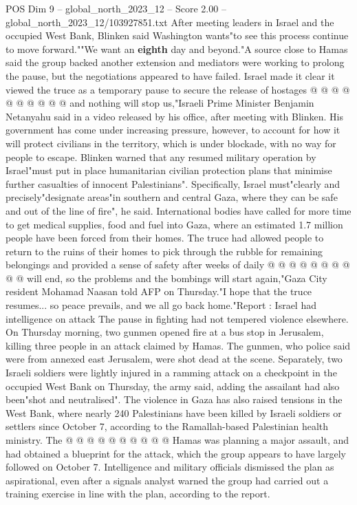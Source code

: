 \begin{textsample}{POS Dim 9 – global\_north\_2023\_12 – Score 2.00 – global\_north\_2023\_12/103927851.txt}
After meeting leaders in Israel and the occupied West Bank, Blinken said Washington wants"to see this process continue to move forward.""We want an \textbf{eighth} day and beyond."A source close to Hamas said the group backed another extension and mediators were working to prolong the pause, but the negotiations appeared to have failed.
Israel made it clear it viewed the truce as a temporary pause to secure the release of hostages @ @ @ @ @ @ @ @ @ @ and nothing will stop us,"Israeli Prime Minister Benjamin Netanyahu said in a video released by his office, after meeting with Blinken.
His government has come under increasing pressure, however, to account for how it will protect civilians in the territory, which is under blockade, with no way for people to escape.
Blinken warned that any resumed military operation by Israel"must put in place humanitarian civilian protection plans that minimise further casualties of innocent Palestinians".
Specifically, Israel must"clearly and precisely"designate areas"in southern and central Gaza, where they can be safe and out of the line of fire", he said.
International bodies have called for more time to get medical supplies, food and fuel into Gaza, where an estimated 1.7 million people have been forced from their homes.
The truce had allowed people to return to the ruins of their homes to pick through the rubble for remaining belongings and provided a sense of safety after weeks of daily @ @ @ @ @ @ @ @ @ @ will end, so the problems and the bombings will start again,"Gaza City resident Mohamad Naasan told AFP on Thursday."I hope that the truce resumes... so peace prevails, and we all go back home."Report : Israel had intelligence on attack The pause in fighting had not tempered violence elsewhere.
On Thursday morning, two gunmen opened fire at a bus stop in Jerusalem, killing three people in an attack claimed by Hamas.
The gunmen, who police said were from annexed east Jerusalem, were shot dead at the scene.
Separately, two Israeli soldiers were lightly injured in a ramming attack on a checkpoint in the occupied West Bank on Thursday, the army said, adding the assailant had also been"shot and neutralised".
The violence in Gaza has also raised tensions in the West Bank, where nearly 240 Palestinians have been killed by Israeli soldiers or settlers since October 7, according to the Ramallah-based Palestinian health ministry.
The @ @ @ @ @ @ @ @ @ @ Hamas was planning a major assault, and had obtained a blueprint for the attack, which the group appears to have largely followed on October 7.
Intelligence and military officials dismissed the plan as aspirational, even after a signals analyst warned the group had carried out a training exercise in line with the plan, according to the report.

\end{textsample}
